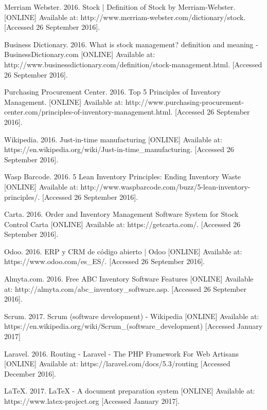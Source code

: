 \begin{thebibliography}{9}

Merriam Webster. 2016. Stock | Definition of Stock by Merriam-Webster. [ONLINE] Available at: http://www.merriam-webster.com/dictionary/stock. [Accessed 26 September 2016].

Business Dictionary. 2016. What is stock management? definition and meaning - BusinessDictionary.com [ONLINE] Available at: http://www.businessdictionary.com/definition/stock-management.html. [Accessed 26 September 2016].

Purchasing Procurement Center. 2016. Top 5 Principles of Inventory Management. [ONLINE] Available at: http://www.purchasing-procurement-center.com/principles-of-inventory-management.html. [Accessed 26 September 2016].

Wikipedia. 2016. Just-in-time manufacturing [ONLINE] Available at: https://en.wikipedia.org/wiki/Just-in-time\_manufacturing. [Accessed 26 September 2016].

Wasp Barcode. 2016. 5 Lean Inventory Principles: Ending Inventory Waste [ONLINE] Available at: http://www.waspbarcode.com/buzz/5-lean-inventory-principles/. [Accessed 26 September 2016].

Carta. 2016. Order and Inventory Management Software System for Stock Control Carta [ONLINE] Available at: https://getcarta.com/. [Accessed 26 September 2016].

Odoo. 2016. ERP y CRM de código abierto | Odoo [ONLINE] Available at: https://www.odoo.com/es\_ES/. [Accessed 26 September 2016].

Almyta.com. 2016. Free ABC Inventory Software Features [ONLINE] Available at: http://almyta.com/abc\_inventory\_software.asp. [Accessed 26 September 2016].

Scrum. 2017. Scrum (software development) - Wikipedia [ONLINE] Available at: https://en.wikipedia.org/wiki/Scrum\_(software\_development) [Accessed January 2017]

Laravel. 2016. Routing - Laravel - The PHP Framework For Web Artisans [ONLINE] Available at: https://laravel.com/docs/5.3/routing [Accessed December 2016].

LaTeX. 2017. LaTeX - A document preparation system [ONLINE] Available at: https://www.latex-project.org [Accessed January 2017].

\end{thebibliography}